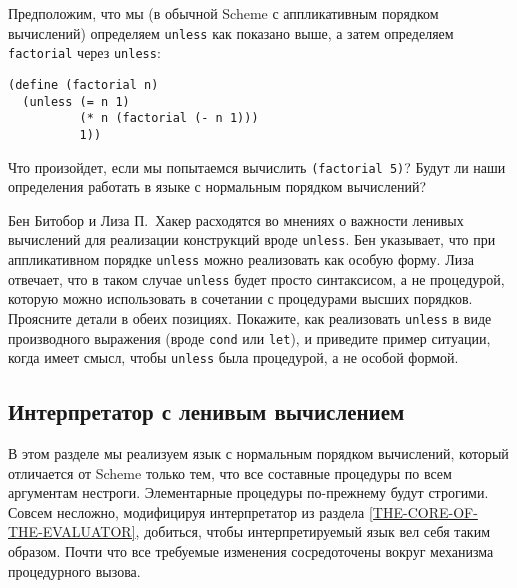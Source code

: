 \begin{exercise}{4.25}%
\label{EX4.25}%
Предположим, что мы (в обычной Scheme с аппликативным
порядком вычислений) определяем {\tt unless} как показано выше,
а затем определяем {\tt factorial} через {\tt unless}:

\begin{Verbatim}[fontsize=\small]
(define (factorial n)
  (unless (= n 1)
          (* n (factorial (- n 1)))
          1))
\end{Verbatim}
Что произойдет, если мы попытаемся вычислить {\tt (factorial
5)}?  Будут ли наши определения работать в языке с нормальным
порядком вычислений?
\end{exercise}

\begin{exercise}{4.26}%
\label{EX4.26}%
Бен Битобор и Лиза П.~Хакер расходятся во мнениях
о важности ленивых вычислений для реализации конструкций вроде
{\tt unless}.  Бен указывает, что при аппликативном порядке
{\tt unless} можно реализовать как  особую форму.  Лиза
отвечает, что в таком случае {\tt unless} будет просто
синтаксисом, а не процедурой, которую можно использовать в сочетании с
процедурами высших порядков.  Проясните детали в обеих позициях.
Покажите, как реализовать {\tt unless} в виде производного
выражения (вроде {\tt cond} или {\tt let}), и
приведите пример ситуации, когда имеет смысл, чтобы
{\tt unless} была процедурой, а не особой формой.
\end{exercise}

\subsection{Интерпретатор с ленивым вычислением}
\label{AN-INTERPRETER-WITH-LAZY-EVALUATION}%


В этом разделе мы реализуем язык с нормальным порядком
вычислений, который отличается от Scheme только тем, что все составные
процедуры по всем аргументам нестроги.  Элементарные процедуры
по-прежнему будут строгими.  Совсем несложно, модифицируя
интерпретатор из раздела \ref{THE-CORE-OF-THE-EVALUATOR}, добиться, чтобы
интерпретируемый язык вел себя таким образом.  Почти что все требуемые изменения
сосредоточены вокруг механизма процедурного вызова.

